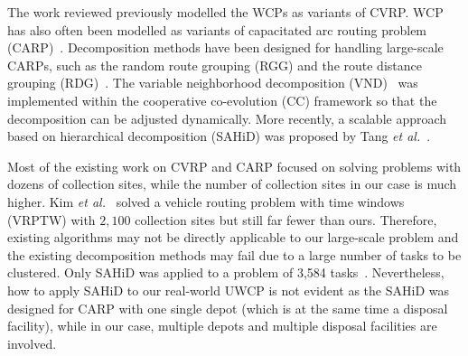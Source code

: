 \documentclass[journal]{IEEEtran}
\begin{document}
The work reviewed previously modelled the WCPs as variants of CVRP. WCP has also often been modelled as variants of capacitated arc routing problem (CARP)~\cite{tang2009memetic,mei2013decomposing,mei2014cooperative,tang2017scalable,akhtar2017backtracking,mi2017optimization}. 
Decomposition methods have been designed for handling large-scale CARPs, such as the random route grouping (RGG) and the route distance grouping (RDG)~\cite{mei2013decomposing}. The variable neighborhood decomposition (VND)~\cite{mei2014cooperative} was implemented within the cooperative co-evolution (CC) framework so that the decomposition can be adjusted dynamically. 
More recently, a scalable approach based on hierarchical decomposition (SAHiD) was proposed by Tang \emph{et al.}~\cite{tang2017scalable}. 

Most of the existing work on CVRP and CARP focused on solving problems with dozens of  collection sites, while the number of collection sites in our case is much higher. Kim \emph{et al.}~\cite{kim2006waste} solved a vehicle routing problem with time windows (VRPTW) with $2,100$ collection sites but still far fewer than ours. Therefore, existing algorithms may not be directly applicable to our large-scale problem and the existing decomposition methods may fail due to a large number of tasks to be clustered.
Only SAHiD was applied to a problem of 3,584 tasks~\cite{tang2017scalable}. Nevertheless, how to apply SAHiD to our real-world UWCP is not evident as the SAHiD was designed for CARP with one single depot (which is at the same time a disposal facility), while in our case, multiple depots and multiple disposal facilities are involved. 
\end{document}
